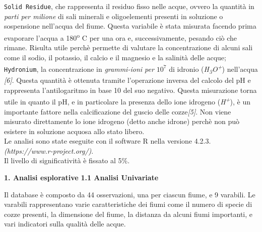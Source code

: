 \documentclass{article} %
\begin{document}
\texttt{Solid Residue}, che rappresenta il residuo fisso nelle acque, ovvero la quantità in \textit{parti per milione} di sali minerali e oligoelementi presenti in soluzione o sospensione nell'acqua del fiume. Questa variabile è stata misurata facendo prima evaporare l'acqua a 180\textsuperscript{o} C per una ora e, successivamente, pesando ciò che rimane. Risulta utile perchè permette di valutare la concentrazione di alcuni sali come il sodio, il potassio, il calcio e il magnesio e la salinità delle acque; 
\texttt{Hydronium}, la concentrazione in \textit{grammi-ioni per $10^7$} di idronio (\textit{H\textsubscript{3}O\textsuperscript{+}}) nell'acqua \textit{[6]}. Questa quantità è ottenuta tramite l'operazione inversa del calcolo del pH e rappresenta l'antilogaritmo in base 10 del suo negativo. Questa misurazione torna utile in quanto il pH, e in particolare la presenza dello ione idrogeno (\textit{H\textsuperscript{+}}), è un importante fattore nella calcificazione del guscio delle cozze\textit{[5]}. Non viene misurato direttamente lo ione idrogeno (detto anche idrone) perchè non può esistere in soluzione acquosa allo stato libero. \\
Le analisi sono state eseguite con il software R nella versione 4.2.3.\\\textit{(https://www.r-project.org/)}.\\ Il livello di significatività è fissato al 5\%.


\newpage
\begin{flushleft}
    \textbf{\Huge 1. \: Analisi esplorative}
    \vskip 30pt
    \textbf{\Large 1.1 \: Analisi Univariate}
\end{flushleft}
\vskip 10pt

Il database è composto da 44 osservazioni, una per ciascun fiume, e 9 varabili. 
Le varabili rappresentano varie caratteristiche dei fiumi come il numero di specie di cozze presenti, la dimensione del fiume, la distanza da alcuni fiumi importanti, e vari indicatori sulla qualità delle acque.\\
\end{document}
